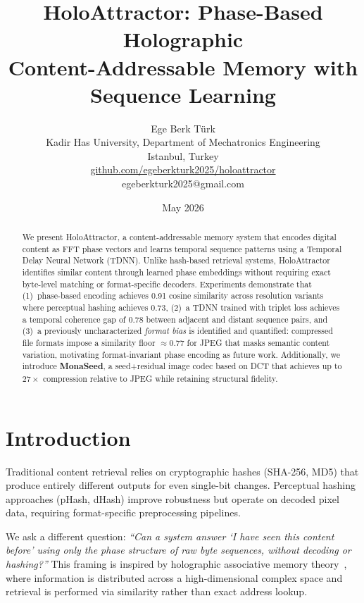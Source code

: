 \documentclass[10pt,twocolumn]{article}
\title{\textbf{HoloAttractor}: Phase-Based Holographic\\
Content-Addressable Memory with Sequence Learning}
\author{
  Ege Berk T{\"u}rk \\
  \small Kadir Has University, Department of Mechatronics Engineering \\
  \small Istanbul, Turkey \\
  \small \href{https://github.com/egeberkturk2025/holoattractor}{github.com/egeberkturk2025/holoattractor} \\
  \small egeberkturk2025@gmail.com
}
\date{May 2026}
\begin{document}
\maketitle

\begin{abstract}
We present HoloAttractor, a content-addressable memory system that encodes
digital content as FFT phase vectors and learns temporal sequence patterns
using a Temporal Delay Neural Network (TDNN). Unlike hash-based retrieval
systems, HoloAttractor identifies similar content through learned phase
embeddings without requiring exact byte-level matching or format-specific
decoders. Experiments demonstrate that (1)~phase-based encoding achieves
0.91 cosine similarity across resolution variants where perceptual hashing
achieves 0.73, (2)~a TDNN trained with triplet loss achieves a temporal
coherence gap of 0.78 between adjacent and distant sequence pairs, and
(3)~a previously uncharacterized \emph{format bias} is identified and
quantified: compressed file formats impose a similarity floor $\approx$0.77
for JPEG that masks semantic content variation, motivating format-invariant
phase encoding as future work. Additionally, we introduce \textbf{MonaSeed},
a seed+residual image codec based on DCT that achieves up to $27\times$
compression relative to JPEG while retaining structural fidelity.
\end{abstract}

\section{Introduction}
Traditional content retrieval relies on cryptographic hashes (SHA-256, MD5)
that produce entirely different outputs for even single-bit changes.
Perceptual hashing approaches (pHash, dHash) improve robustness but operate
on decoded pixel data, requiring format-specific preprocessing pipelines.

We ask a different question: \textit{``Can a system answer `I have seen this
content before' using only the phase structure of raw byte sequences, without
decoding or hashing?''} This framing is inspired by holographic associative
memory theory~\cite{hopfield1982}, where information is distributed across a
high-dimensional complex space and retrieval is performed via similarity
rather than exact address lookup.
\end{document}
